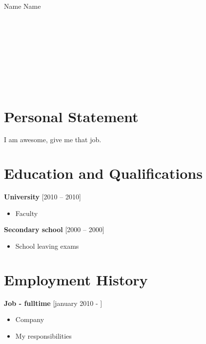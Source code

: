 \documentclass[11pt]{article}
\begin{document}
\begin{center}
        {\fontsize{35}{45}\selectfont Name Name} \\
        \ \\
         \\
         \\
         \\
         \\
         \\
         \\
        \ \\
\end{center}

\section*{Personal Statement}
\noindent{\rule{\linewidth}{0.4pt}}
I am awesome, give me that job.

\section*{Education and Qualifications}
\noindent{\rule{\linewidth}{0.4pt}}
\textbf{University} [2010 – 2010]
\begin{itemize}
        \item Faculty
\end{itemize}
\textbf{Secondary school} [2000 – 2000]
\begin{itemize}
        \item School leaving exams
\end{itemize}

\section*{Employment History}
\noindent{\rule{\linewidth}{0.4pt}}
\textbf{Job - fulltime} [january 2010 - ]
\begin{itemize}
        \item Company
        \item My responsibilities
\end{itemize}
\end{document}
